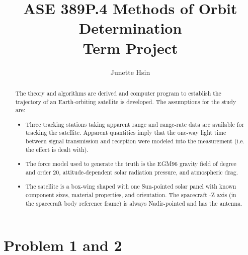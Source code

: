 \documentclass[conf]{new-aiaa}
\title{ASE 389P.4 Methods of Orbit Determination \\ Term Project}
\author{Junette Hsin}
\affil{Masters Student, Aerospace Engineering and Engineering Mechanics, University of Texas, Austin, TX 78712}
\begin{document}
\maketitle

\begin{abstract}
	The theory and algorithms are derived and computer program to establish the trajectory of
	an Earth-orbiting satellite is developed. The assumptions for the study are:
	
	\begin{itemize}
		\item Three tracking stations taking apparent range and range-rate data are available for tracking the	satellite. Apparent quantities imply that the one-way light time between signal transmission and reception were modeled into the measurement (i.e. the effect is dealt with).
		\item The force model used to generate the truth is the EGM96 gravity field of degree and order 20,
		attitude-dependent solar radiation pressure, and atmospheric drag.
		\item The satellite is a box-wing shaped with one Sun-pointed solar panel with known component sizes, material properties, and orientation. The spacecraft -Z axis (in the spacecraft body reference frame) is always Nadir-pointed and has the antenna.
	\end{itemize}
	

\end{abstract}



\section*{Problem 1 and 2}

\begin{center}
 \\
\end{center}
\end{document}
